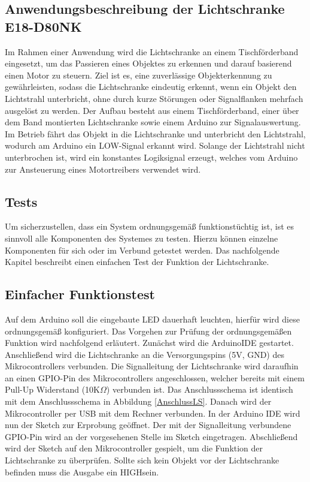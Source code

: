 

\subsection{Anwendungsbeschreibung der Lichtschranke E18-D80NK}

Im Rahmen einer Anwendung wird die Lichtschranke an einem Tischförderband eingesetzt, um das Passieren eines Objektes zu erkennen und darauf basierend einen Motor zu steuern. Ziel ist es, eine zuverlässige Objekterkennung zu gewährleisten, sodass die Lichtschranke eindeutig erkennt, wenn ein Objekt den Lichtstrahl  unterbricht, ohne durch kurze Störungen oder Signalflanken mehrfach ausgelöst zu werden.
Der Aufbau besteht aus einem Tischförderband, einer über dem Band montierten Lichtschranke sowie einem Arduino zur Signalauswertung. 
Im Betrieb fährt das Objekt in  die Lichtschranke und unterbricht den Lichtstrahl, wodurch am Arduino ein LOW-Signal erkannt wird. Solange der Lichtstrahl nicht unterbrochen ist, wird ein konstantes Logiksignal erzeugt, welches vom Arduino zur Ansteuerung eines Motortreibers verwendet wird.

\subsection{Tests}
Um sicherzustellen, dass ein System ordnungsgemäß funktionstüchtig ist, ist es sinnvoll alle Komponenten des Systemes zu testen. 
Hierzu können einzelne Komponenten für sich oder im Verbund getestet werden. Das nachfolgende Kapitel beschreibt einen einfachen Test der Funktion der Lichtschranke.
\subsection{Einfacher Funktionstest}
Auf dem Arduino soll die eingebaute LED dauerhaft leuchten, hierfür wird diese ordnungsgemäß konfiguriert. Das Vorgehen zur Prüfung der ordnungsgemäßen Funktion wird nachfolgend erläutert.
Zunächst wird die ArduinoIDE gestartet. Anschließend wird die Lichtschranke an die Versorgungspins (5V, GND) des Mikrocontrollers verbunden. Die Signalleitung der Lichtschranke wird daraufhin an einen GPIO-Pin des Mikrocontrollers angeschlossen, welcher bereits mit einem Pull-Up Widerstand (10K$\Omega$) verbunden ist. Das Anschlussschema ist identisch mit dem Anschlussschema in Abbildung \ref{AnschlussLS}.
 Danach wird der Mikrocontroller per USB mit dem Rechner verbunden. In der Arduino IDE wird nun der Sketch zur Erprobung geöffnet. Der mit der Signalleitung verbundene GPIO-Pin wird an der vorgesehenen Stelle im Sketch eingetragen. Abschließend wird der Sketch auf den Mikrocontroller gespielt, um die Funktion der Lichtschranke zu überprüfen. Sollte sich kein Objekt vor der Lichtschranke befinden muss die Ausgabe ein \glqq HIGH\grqq \space sein. 
